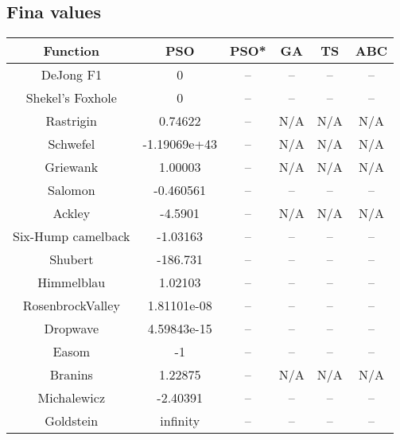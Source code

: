 \subsection{Fina values}
\begin{center}
	\begin{tabular}{| c | c | c | c | c | c |}
	\hline
	Function & PSO & PSO* & GA & TS & ABC\\  \hline
	DeJong F1 & 0 & -- & -- & -- & --\\ \hline
	Shekel's Foxhole & 0 & -- & -- & -- & --\\ \hline
	Rastrigin & 0.74622 & -- & N/A & N/A & N/A\\ \hline
	Schwefel & -1.19069e+43 & -- & N/A & N/A & N/A\\ \hline
	Griewank & 1.00003 & -- & N/A & N/A & N/A\\ \hline
	Salomon & -0.460561 & -- & -- & -- & --\\ \hline
	Ackley & -4.5901 & -- & N/A & N/A & N/A\\ \hline
	Six-Hump camelback & -1.03163 & -- & -- & -- & --\\ \hline
	Shubert & -186.731 & -- & -- & -- & --\\ \hline
	Himmelblau & 1.02103 & -- & -- & -- & --\\ \hline
	RosenbrockValley & 1.81101e-08 & -- & -- & -- & --\\ \hline
	Dropwave & 4.59843e-15 & -- & -- & -- & --\\ \hline
	Easom & -1 & -- & -- & -- & --\\ \hline
	Branins & 1.22875 & -- & N/A & N/A & N/A\\ \hline
	Michalewicz & -2.40391 & -- & -- & -- & --\\ \hline
	Goldstein & infinity & -- & -- & -- & --\\ \hline
	\end{tabular}
\end{center}
